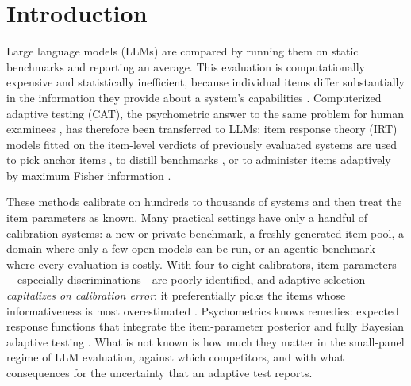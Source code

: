 \section{Introduction}
\label{sec:intro}

Large language models (LLMs) are compared by running them on static benchmarks and
reporting an average. This evaluation is computationally expensive and statistically
inefficient, because individual items differ substantially in the information they provide
about a system's capabilities \citep{lalor2016building,rodriguez2021evaluation}.
Computerized adaptive testing (CAT), the psychometric answer to the same problem for human
examinees \citep{lord1980applications,wainer2000cat}, has therefore been transferred to
LLMs: item response theory (IRT) models fitted on the item-level verdicts of previously
evaluated systems are used to pick anchor items \citep{vivek2024anchor,polo2024tinybenchmarks},
to distill benchmarks \citep{kipnis2025metabench}, or to administer items adaptively by
maximum Fisher information \citep{hofmann2025fluid,li2026atlas,zheng2026medcat,zhou2026lost}.

These methods calibrate on hundreds to thousands of systems and then treat the item
parameters as known. Many practical settings have only a handful of calibration systems: a
new or private benchmark, a freshly generated item pool, a domain where only a few open
models can be run, or an agentic benchmark where every evaluation is costly. With four to
eight calibrators, item parameters---especially discriminations---are poorly identified,
and adaptive selection \emph{capitalizes on calibration error}: it preferentially picks the
items whose informativeness is most overestimated
\citep{vanderlinden2000capitalization,patton2013influence}. Psychometrics knows remedies:
expected response functions that integrate the item-parameter posterior
\citep{mislevy1994erf} and fully Bayesian adaptive testing
\citep{vanderlinden2020fast,fink2025accounting}. What is not known is how much they matter
in the small-panel regime of LLM evaluation, against which competitors, and with what
consequences for the uncertainty that an adaptive test reports.

